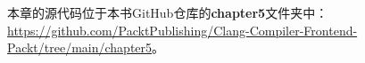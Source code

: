 
本章的源代码位于本书GitHub仓库的\textbf{chapter5}文件夹中： \url{https://github.com/PacktPublishing/Clang-Compiler-Frontend-Packt/tree/main/chapter5}。
